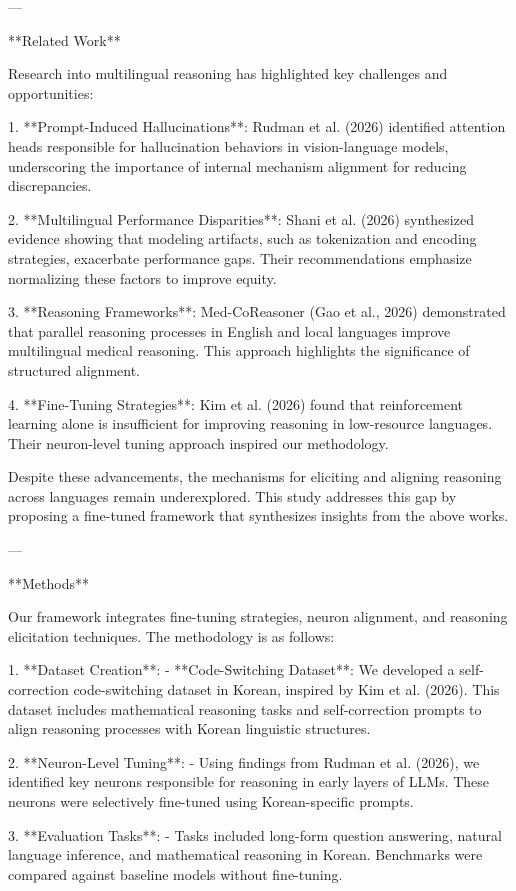 ---

**Related Work**

Research into multilingual reasoning has highlighted key challenges and opportunities:

1. **Prompt-Induced Hallucinations**: Rudman et al. (2026) identified attention heads responsible for hallucination behaviors in vision-language models, underscoring the importance of internal mechanism alignment for reducing discrepancies.
   
2. **Multilingual Performance Disparities**: Shani et al. (2026) synthesized evidence showing that modeling artifacts, such as tokenization and encoding strategies, exacerbate performance gaps. Their recommendations emphasize normalizing these factors to improve equity.

3. **Reasoning Frameworks**: Med-CoReasoner (Gao et al., 2026) demonstrated that parallel reasoning processes in English and local languages improve multilingual medical reasoning. This approach highlights the significance of structured alignment.

4. **Fine-Tuning Strategies**: Kim et al. (2026) found that reinforcement learning alone is insufficient for improving reasoning in low-resource languages. Their neuron-level tuning approach inspired our methodology.

Despite these advancements, the mechanisms for eliciting and aligning reasoning across languages remain underexplored. This study addresses this gap by proposing a fine-tuned framework that synthesizes insights from the above works.

---

**Methods**

Our framework integrates fine-tuning strategies, neuron alignment, and reasoning elicitation techniques. The methodology is as follows:

1. **Dataset Creation**:
   - **Code-Switching Dataset**: We developed a self-correction code-switching dataset in Korean, inspired by Kim et al. (2026). This dataset includes mathematical reasoning tasks and self-correction prompts to align reasoning processes with Korean linguistic structures.

2. **Neuron-Level Tuning**:
   - Using findings from Rudman et al. (2026), we identified key neurons responsible for reasoning in early layers of LLMs. These neurons were selectively fine-tuned using Korean-specific prompts.

3. **Evaluation Tasks**:
   - Tasks included long-form question answering, natural language inference, and mathematical reasoning in Korean. Benchmarks were compared against baseline models without fine-tuning.

